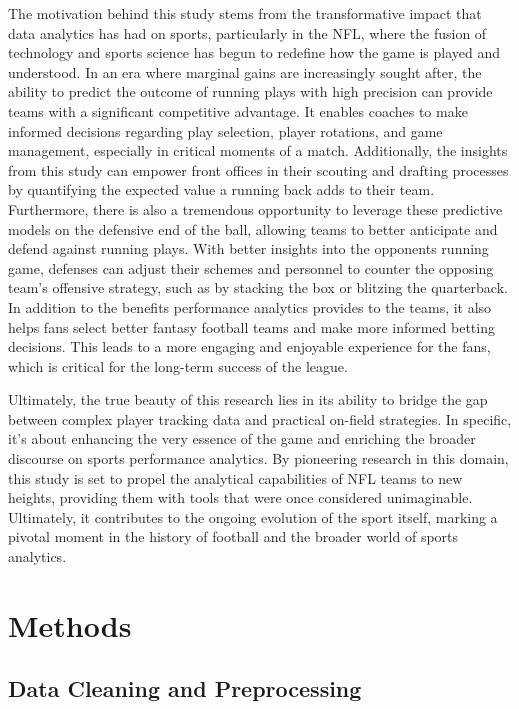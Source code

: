 \documentclass[
  super,
  preprint,
  3p]{elsarticle}
\begin{document}
The motivation behind this study stems from the transformative impact
that data analytics has had on sports, particularly in the NFL, where
the fusion of technology and sports science has begun to redefine how
the game is played and understood. In an era where marginal gains are
increasingly sought after, the ability to predict the outcome of running
plays with high precision can provide teams with a significant
competitive advantage. It enables coaches to make informed decisions
regarding play selection, player rotations, and game management,
especially in critical moments of a match. Additionally, the insights
from this study can empower front offices in their scouting and drafting
processes by quantifying the expected value a running back adds to their
team. Furthermore, there is also a tremendous opportunity to leverage
these predictive models on the defensive end of the ball, allowing teams
to better anticipate and defend against running plays. With better
insights into the opponents running game, defenses can adjust their
schemes and personnel to counter the opposing team's offensive strategy,
such as by stacking the box or blitzing the quarterback. In addition to
the benefits performance analytics provides to the teams, it also helps
fans select better fantasy football teams and make more informed betting
decisions. This leads to a more engaging and enjoyable experience for
the fans, which is critical for the long-term success of the league.

Ultimately, the true beauty of this research lies in its ability to
bridge the gap between complex player tracking data and practical
on-field strategies. In specific, it's about enhancing the very essence
of the game and enriching the broader discourse on sports performance
analytics. By pioneering research in this domain, this study is set to
propel the analytical capabilities of NFL teams to new heights,
providing them with tools that were once considered unimaginable.
Ultimately, it contributes to the ongoing evolution of the sport itself,
marking a pivotal moment in the history of football and the broader
world of sports analytics.

\hypertarget{methods}{%
\section{Methods}\label{methods}}

\hypertarget{data-cleaning-and-preprocessing}{%
\subsection{Data Cleaning and
Preprocessing}\label{data-cleaning-and-preprocessing}}
\end{document}
